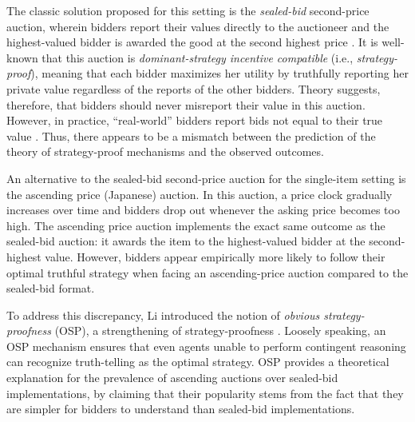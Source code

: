 The classic solution proposed for this 
setting is the \emph{sealed-bid} second-price auction, wherein bidders report their values directly to the auctioneer and the highest-valued bidder is awarded the good at the second highest price \cite{Vic61}.  It is well-known that this auction is \emph{dominant-strategy incentive compatible} (i.e., \emph{strategy-proof}), meaning that each bidder maximizes her utility by truthfully reporting her private value regardless of the reports of the other bidders.  Theory suggests, therefore, that bidders should never misreport their value in this auction.  However, in practice, 
``real-world'' bidders report bids not equal to their true value \cite{KHL1987}.  Thus, there appears to be a mismatch between the prediction of the theory of strategy-proof mechanisms and the observed outcomes. 

An alternative to the sealed-bid second-price auction for the single-item setting is the ascending price (Japanese) auction.  In this auction, a price clock gradually increases over time and bidders drop out whenever the asking price becomes too high.  The ascending price auction implements the exact same outcome as the sealed-bid auction: it awards the item to the highest-valued bidder at the second-highest value. However, bidders appear empirically  more likely to follow their optimal truthful strategy when facing an ascending-price auction compared to the sealed-bid format.

To address this discrepancy, Li introduced the notion of \emph{obvious strategy-proofness} (OSP), a strengthening of strategy-proofness \cite{li}. Loosely speaking, an OSP mechanism ensures that even agents unable to perform contingent reasoning can recognize truth-telling as the optimal strategy. OSP provides a theoretical explanation for the prevalence of ascending auctions over sealed-bid implementations, by claiming that their popularity stems from the fact that they are simpler for bidders to understand than sealed-bid implementations.


